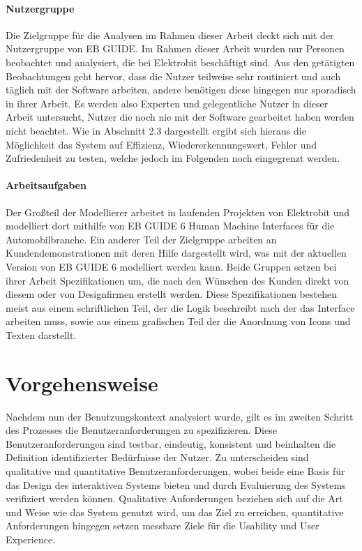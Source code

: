 \paragraph{Nutzergruppe}
Die Zielgruppe für die Analysen im Rahmen dieser Arbeit deckt sich  mit der Nutzergruppe von EB GUIDE.
Im Rahmen dieser Arbeit wurden nur Personen beobachtet und analysiert, die bei Elektrobit beschäftigt sind.
Aus den getätigten Beobachtungen geht hervor, dass die Nutzer teilweise sehr routiniert und auch täglich mit der Software arbeiten, andere benötigen diese hingegen nur sporadisch in ihrer Arbeit.
Es werden also Experten und gelegentliche Nutzer in dieser Arbeit untersucht, Nutzer die noch nie mit der Software gearbeitet haben werden nicht beachtet.
Wie in Abschnitt 2.3 dargestellt ergibt sich hieraus die Möglichkeit das System auf Effizienz, Wiedererkennungswert, Fehler und Zufriedenheit zu testen, welche jedoch im Folgenden noch eingegrenzt werden.

\paragraph{Arbeitsaufgaben}
Der Großteil der Modellierer arbeitet in laufenden Projekten von Elektrobit und modelliert dort mithilfe von EB GUIDE 6 Human Machine Interfaces für die Automobilbranche.
Ein anderer Teil der Zielgruppe arbeiten an Kundendemonstrationen mit deren Hilfe dargestellt wird, was mit der aktuellen Version von EB GUIDE 6 modelliert werden kann.
Beide Gruppen setzen bei ihrer Arbeit Spezifikationen um, die nach den Wünschen des Kunden direkt von diesem oder von Designfirmen erstellt werden.
Diese Spezifikationen bestehen meist aus einem schriftlichen Teil, der die Logik beschreibt nach der das Interface arbeiten muss, sowie aus einem grafischen Teil der die Anordnung von Icons und Texten darstellt.

\section{Vorgehensweise}
Nachdem nun der Benutzungskontext analysiert wurde, gilt es im zweiten Schritt des Prozesses die Benutzeranforderungen zu spezifizieren.
Diese Benutzeranforderungen sind testbar, eindeutig, konsistent und beinhalten die Definition identifizierter Bedürfnisse der Nutzer.
Zu unterscheiden sind qualitative und quantitative Benutzeranforderungen, wobei beide eine Basis für das Design des interaktiven Systems bieten und durch Evaluierung des Systems verifiziert werden können.
Qualitative Anforderungen beziehen sich auf die Art und Weise wie das System genutzt wird, um das Ziel zu erreichen, quantitative Anforderungen hingegen setzen messbare Ziele für die Usability und User Experience.\cite{.f}

